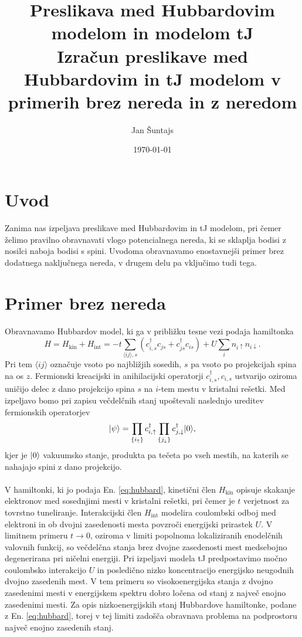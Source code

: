 \documentclass[10pt,a4paper]{article}
\author{\normalsize Jan Šuntajs } %
\title{\large Preslikava med Hubbardovim modelom in modelom tJ \\ 
\vspace{3mm}
\Large Izračun preslikave med Hubbardovim in tJ modelom v primerih brez nereda in z neredom}
\date{\normalsize \today}
\begin{document}
\maketitle
\section{Uvod}
Zanima nas izpeljava preslikave med Hubbardovim in tJ modelom, pri čemer želimo pravilno obravnavati vlogo potencialnega nereda, ki se sklaplja bodisi z nosilci naboja bodisi s spini. Uvodoma obravnavamo enostavnejši primer brez dodatnega naključnega nereda, v drugem delu pa vključimo tudi tega. 
\section{Primer brez nereda}
Obravnavamo Hubbardov model, ki ga v približku tesne vezi podaja hamiltonka
\begin{equation}\label{eq:hubbard}
H=H_\mathrm{kin} + H_\mathrm{int}=-t\sum\limits_{\langle ij \rangle, s}\left(c^\dagger_{i,s} c_{js} + c^\dagger_{js}c_{is}\right) + U\sum_i n_{i\uparrow}n_{i\downarrow}.
\end{equation}
Pri tem  $\langle ij \rangle$ označuje vsoto po najbližjih sosedih, $s$ pa vsoto po projekcijah spina na os $z$. Fermionski kreacijski in anihilacijski operatorji $c^\dagger_{i,s}, c_{i,s}$ ustvarijo oziroma uničijo delec z dano projekcijo spina $s$ na $i$-tem mestu v kristalni rešetki.  Med izpeljavo bomo pri zapisu večdelčnih stanj upoštevali naslednjo ureditev fermionskih operatorjev
$$
\vert\psi\rangle=\prod\limits_{\{i_\uparrow \}} c_{i, \uparrow}^\dagger \prod\limits_{\{j_\downarrow \}} c_{j, \downarrow}^\dagger \vert0\rangle,
$$
kjer je $\vert0\rangle$ vakuumsko stanje, produkta pa tečeta po vseh mestih, na katerih se nahajajo spini z dano projekcijo. \\\\
V hamiltonki, ki jo podaja En. \eqref{eq:hubbard}, kinetični člen $H_\mathrm{kin}$ opisuje skakanje elektronov med sosednjimi mesti v kristalni rešetki, pri čemer je $t$ verjetnost za tovrstno tuneliranje. Interakcijski člen $H_\mathrm{int}$ modelira coulombski odboj med elektroni in ob dvojni zasedenosti mesta povzroči energijski prirastek $U$. V limitnem primeru $t\to 0$, oziroma v limiti popolnoma lokaliziranih enodelčnih valovnih funkcij, so večdelčna stanja brez dvojne zasedenosti mest medsebojno degenerirana pri ničelni energiji. Pri izpeljavi modela tJ predpostavimo močno coulombsko interakcijo $U$ in posledično nizko koncentracijo energijsko neugodnih dvojno zasedenih mest. V tem primeru so visokoenergijska stanja z dvojno zasedenimi mesti v energijskem spektru dobro ločena od stanj z največ enojno zasedenimi mesti. Za opis nizkoenergijskih stanj Hubbardove hamiltonke, podane z En. \eqref{eq:hubbard}, torej v tej limiti zadošča obravnava problema na podprostoru največ enojno zasedenih stanj.  \\
\end{document}
